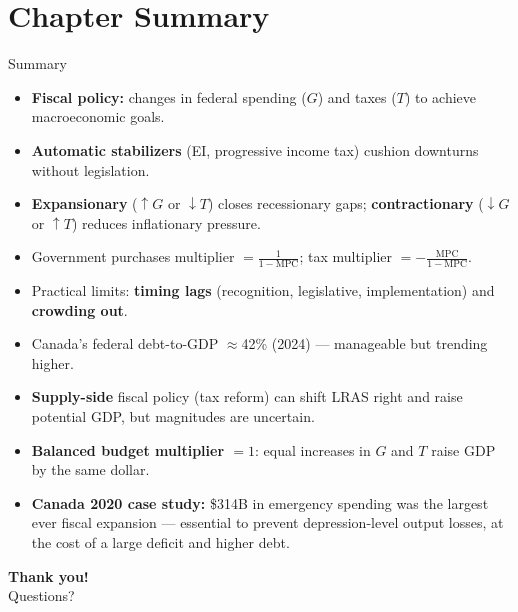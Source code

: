\documentclass[aspectratio=169]{beamer}
\begin{document}
\section*{Chapter Summary}

\begin{frame}{Summary}
\transfade
\begin{itemize}
  \item \textbf{Fiscal policy:} changes in federal spending ($G$) and taxes ($T$) to achieve macroeconomic goals.
  \item \textbf{Automatic stabilizers} (EI, progressive income tax) cushion downturns without legislation.
  \item \textbf{Expansionary} ($\uparrow G$ or $\downarrow T$) closes recessionary gaps; \textbf{contractionary} ($\downarrow G$ or $\uparrow T$) reduces inflationary pressure.
  \item Government purchases multiplier $= \frac{1}{1-\text{MPC}}$; tax multiplier $= -\frac{\text{MPC}}{1-\text{MPC}}$.
  \item Practical limits: \textbf{timing lags} (recognition, legislative, implementation) and \textbf{crowding out}.
  \item Canada's federal debt-to-GDP $\approx$42\% (2024) --- manageable but trending higher.
  \item \textbf{Supply-side} fiscal policy (tax reform) can shift LRAS right and raise potential GDP, but magnitudes are uncertain.
  \item \textbf{Balanced budget multiplier $= 1$}: equal increases in $G$ and $T$ raise GDP by the same dollar.
  \item \textbf{Canada 2020 case study:} \$314B in emergency spending was the largest ever fiscal expansion --- essential to prevent depression-level output losses, at the cost of a large deficit and higher debt.
\end{itemize}
\end{frame}

\begin{frame}
\centering
\Huge \textbf{Thank you!}\\[1em]
\large Questions?
\end{frame}
\end{document}

